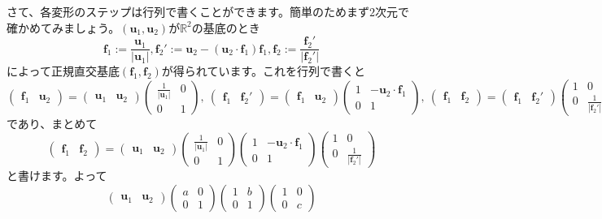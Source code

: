 さて、各変形のステップは行列で書くことができます。簡単のためまず$2$次元で確かめてみましょう。$(\bm{u}_1, \bm{u}_2)$が$\mathbb{R}^2$の基底のとき
\[
\bm{f}_1 := \frac{\bm{u}_1}{|\bm{u}_1|}, \bm{f}_2' := \bm{u}_2 - (\bm{u}_2 \cdot \bm{f}_1)\bm{f}_1, \bm{f}_2 := \frac{\bm{f}_2'}{|\bm{f}_2'|}
\]
によって正規直交基底$(\bm{f}_1, \bm{f}_2)$が得られています。これを行列で書くと
\[
\begin{pmatrix}
\bm{f}_1 & \bm{u}_2
\end{pmatrix}
=
\begin{pmatrix}
\bm{u}_1 & \bm{u}_2
\end{pmatrix}
\begin{pmatrix}
\frac{1}{|\bm{u}_1|} & 0 \\
0 & 1
\end{pmatrix}, \ 
\begin{pmatrix}
\bm{f}_1 & \bm{f}_2'
\end{pmatrix}
=
\begin{pmatrix}
\bm{f}_1 & \bm{u}_2
\end{pmatrix}
\begin{pmatrix}
1 & -\bm{u}_2 \cdot \bm{f}_1 \\
0 & 1
\end{pmatrix}, \ 
\begin{pmatrix}
\bm{f}_1 & \bm{f}_2
\end{pmatrix}
=
\begin{pmatrix}
\bm{f}_1 & \bm{f}_2'
\end{pmatrix}
\begin{pmatrix}
1 & 0 \\
0 & \frac{1}{|\bm{f}_2'|}
\end{pmatrix}
\]
であり、まとめて
\[
\begin{pmatrix}
\bm{f}_1 & \bm{f}_2
\end{pmatrix}
=
\begin{pmatrix}
\bm{u}_1 & \bm{u}_2
\end{pmatrix}
\begin{pmatrix}
\frac{1}{|\bm{u}_1|} & 0 \\
0 & 1
\end{pmatrix}\begin{pmatrix}
1 & -\bm{u}_2 \cdot \bm{f}_1 \\
0 & 1
\end{pmatrix}
\begin{pmatrix}
1 & 0 \\
0 & \frac{1}{|\bm{f}_2'|}
\end{pmatrix}
\]
と書けます。よって
\[
\begin{pmatrix}
\bm{u}_1 & \bm{u}_2
\end{pmatrix}
\begin{pmatrix}
a & 0 \\
0 & 1
\end{pmatrix}\begin{pmatrix}
1 & b \\
0 & 1
\end{pmatrix}
\begin{pmatrix}
1 & 0 \\
0 & c
\end{pmatrix}
\]
